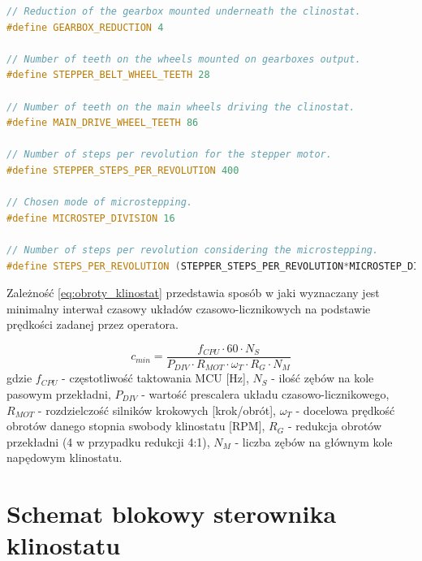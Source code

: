 \begin{lstlisting}[language=C++, caption=clinostat\_mechanics.hpp]
// Reduction of the gearbox mounted underneath the clinostat.
#define GEARBOX_REDUCTION 4 

// Number of teeth on the wheels mounted on gearboxes output.
#define STEPPER_BELT_WHEEL_TEETH 28 

// Number of teeth on the main wheels driving the clinostat.
#define MAIN_DRIVE_WHEEL_TEETH 86 

// Number of steps per revolution for the stepper motor.
#define STEPPER_STEPS_PER_REVOLUTION 400 

// Chosen mode of microstepping.
#define MICROSTEP_DIVISION 16 

// Number of steps per revolution considering the microstepping.
#define STEPS_PER_REVOLUTION (STEPPER_STEPS_PER_REVOLUTION*MICROSTEP_DIVISION)
\end{lstlisting}

Zależność \ref{eq:obroty_klinostat} przedstawia sposób w jaki wyznaczany jest minimalny interwał czasowy układów czasowo-licznikowych na podstawie prędkości zadanej przez operatora.

\begin{equation}\label{eq:obroty_klinostat}
	c_{min} = \frac{f_{CPU} \cdot 60 \cdot N_S}{P_{DIV} \cdot R_{MOT} \cdot \omega_T \cdot R_G \cdot N_M}
\end{equation}
gdzie $f_{CPU}$ - częstotliwość taktowania MCU  [Hz], $N_S$ - ilość zębów na kole pasowym przekładni, $P_{DIV}$ - wartość prescalera układu czasowo-licznikowego, $R_{MOT}$ - rozdzielczość silników krokowych [krok/obrót], $\omega_T$ - docelowa prędkość obrotów danego stopnia swobody klinostatu [RPM], $R_G$ - redukcja obrotów przekładni (4 w przypadku redukcji 4:1), $N_M$ - liczba zębów na głównym kole napędowym klinostatu.

\section{Schemat blokowy sterownika klinostatu}

